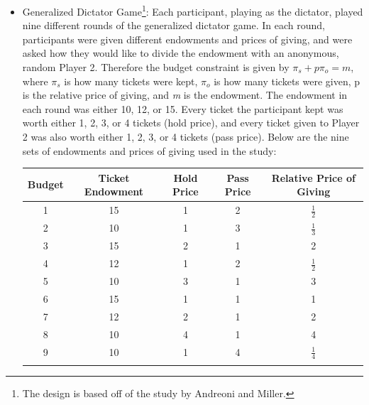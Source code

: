 \documentclass[12pt]{article}
\begin{document}
\begin{itemize}

\item{Generalized Dictator Game\footnote{The design is based off of the study by Andreoni and Miller.}}:  Each participant, playing as the dictator, played nine different rounds of the generalized dictator game. In each round, participants were given different endowments and prices of giving, and were asked how they would like to divide the endowment with an anonymous, random Player 2. Therefore the budget constraint is given by \(\pi_{s} + p\pi_{o} = \textit{m}\), where \(\pi_{s}\) is how many tickets were kept, \(\pi_{o}\) is how many tickets were given, p is the relative price of giving, and \textit{m} is the endowment. The endowment in each round was either 10, 12, or 15. Every ticket the participant kept was worth either 1, 2, 3, or 4 tickets (hold price), and every ticket given to Player 2 was also worth either 1, 2, 3, or 4 tickets (pass price). Below are the nine sets of endowments and prices of giving used in the study:
\begin{center}
\begin{tabular}{ c c c c c }
\hline \hline
 Budget & Ticket Endowment & Hold Price & Pass Price & Relative Price of Giving \\ 
 \hline
1 & 15 & 1 & 2 & \(\frac{1}{2}\)  \\  
2 & 10 & 1 & 3 & \(\frac{1}{3}\)  \\  
3 & 15 & 2 & 1 & 2 \\  
4 & 12 & 1 & 2 & \(\frac{1}{2}\)  \\  
5 & 10 & 3 & 1 & 3  \\  
6 & 15 & 1 & 1 & 1  \\  
7 & 12 & 2 & 1 & 2 \\  
8 & 10 & 4 & 1 & 4 \\  
9 & 10 & 1 & 4 & \(\frac{1}{4}\)  \\  
\hline \hline \\
\end{tabular}
\end{center}


\end{itemize}
\end{document}
